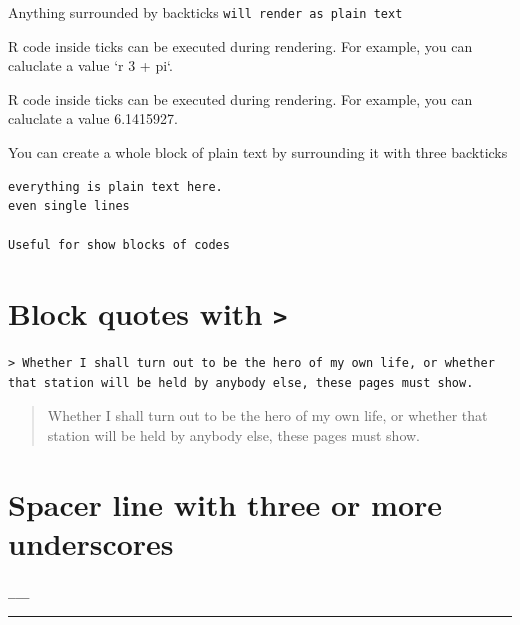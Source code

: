 \documentclass[
]{article}
\newenvironment{Shaded}{\begin{snugshade}}{\end{snugshade}}
\newcommand{\DataTypeTok}[1]{\textcolor[rgb]{0.13,0.29,0.53}{#1}}
\newcommand{\NormalTok}[1]{#1}
\newcommand{\StringTok}[1]{\textcolor[rgb]{0.31,0.60,0.02}{#1}}
\begin{document}
Anything surrounded by backticks \texttt{will\ render\ as\ plain\ text}

\begin{Shaded}
\begin{Highlighting}[]
\NormalTok{R code inside ticks can be executed during rendering. For example, you can caluclate a value }\StringTok{`}\DataTypeTok{r 3 + pi}\StringTok{`}\NormalTok{. }
\end{Highlighting}
\end{Shaded}

R code inside ticks can be executed during rendering. For example, you
can caluclate a value 6.1415927.

You can create a whole block of plain text by surrounding it with three
backticks

\begin{verbatim}
everything is plain text here.
even single lines

Useful for show blocks of codes
\end{verbatim}

\hypertarget{block-quotes-with}{%
\section{\texorpdfstring{Block quotes with
\texttt{\textgreater{}}}{Block quotes with \textgreater{}}}\label{block-quotes-with}}

\begin{verbatim}
> Whether I shall turn out to be the hero of my own life, or whether that station will be held by anybody else, these pages must show.
\end{verbatim}

\begin{quote}
Whether I shall turn out to be the hero of my own life, or whether that
station will be held by anybody else, these pages must show.
\end{quote}

\hypertarget{spacer-line-with-three-or-more-underscores}{%
\section{Spacer line with three or more
underscores}\label{spacer-line-with-three-or-more-underscores}}

\begin{verbatim}
___   
\end{verbatim}

\begin{center}\rule{0.5\linewidth}{0.5pt}\end{center}
\end{document}
